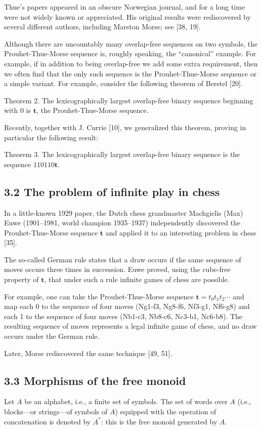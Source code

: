 \documentclass[10pt]{article}
\begin{document}
Thue's papers appeared in an obscure Norwegian journal, and for a long time were not widely known or appreciated. His original results were rediscovered by several different authors, including Marston Morse; see [38, 19].

Although there are uncountably many overlap-free sequences on two symbols, the Prouhet-Thue-Morse sequence is, roughly speaking, the ``canonical'' example. For example, if in addition to being overlap-free we add some extra requirement, then we often find that the only such sequence is the Prouhet-Thue-Morse sequence or a simple variant. For example, consider the following theorem of Berstel [20].

Theorem 2. The lexicographically largest overlap-free binary sequence beginning with 0 is $\mathbf{t}$, the Prouhet-Thue-Morse sequence.

Recently, together with J. Currie [10], we generalized this theorem, proving in particular the following result:

Theorem 3. The lexicographically largest overlap-free binary sequence is the sequence $110110\mathbf{t}$.

\subsection*{3.2 The problem of infinite play in chess}
In a little-known 1929 paper, the Dutch chess grandmaster Machgielis (Max) Euwe (1901--1981, world champion 1935--1937) independently discovered the Prouhet-Thue-Morse sequence $\mathbf{t}$ and applied it to an interesting problem in chess [35].

The so-called German rule states that a draw occurs if the same sequence of moves occurs three times in succession. Euwe proved, using the cube-free property of $\mathbf{t}$, that under such a rule infinite games of chess are possible.

For example, one can take the Prouhet-Thue-Morse sequence $\mathbf{t}=t_{0} t_{1} t_{2} \cdots$ and map each 0 to the sequence of four moves (Ng1-f3, Ng8-f6, Nf3-g1, Nf6-g8) and each 1 to the sequence of four moves (Nb1-c3, Nb8-c6, Nc3-b1, Nc6-b8). The resulting sequence of moves represents a legal infinite game of chess, and no draw occurs under the German rule.

Later, Morse rediscovered the same technique [49, 51].

\subsection*{3.3 Morphisms of the free monoid}
Let $A$ be an alphabet, i.e., a finite set of symbols. The set of words over $A$ (i.e., blocks---or strings---of symbols of $A$) equipped with the operation of concatenation is denoted by $A^{*}$: this is the free monoid generated by $A$.
\end{document}
